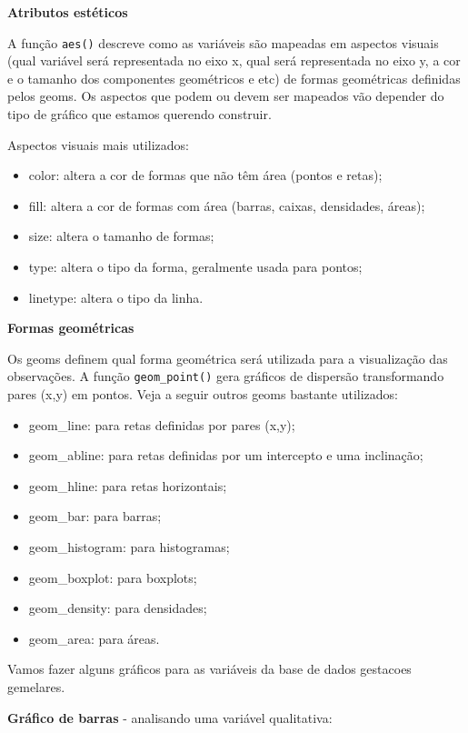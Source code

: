 \documentclass[
]{book}
\begin{document}
\textbf{Atributos estéticos}

A função \texttt{aes()} descreve como as variáveis são mapeadas em aspectos visuais (qual variável será representada no eixo x, qual será representada no eixo y, a cor e o tamanho dos componentes geométricos e etc) de formas geométricas definidas pelos geoms. Os aspectos que podem ou devem ser mapeados vão depender do tipo de gráfico que estamos querendo construir.

Aspectos visuais mais utilizados:

\begin{itemize}
\item
  color: altera a cor de formas que não têm área (pontos e retas);
\item
  fill: altera a cor de formas com área (barras, caixas, densidades, áreas);
\item
  size: altera o tamanho de formas;
\item
  type: altera o tipo da forma, geralmente usada para pontos;
\item
  linetype: altera o tipo da linha.
\end{itemize}

\textbf{Formas geométricas}

Os geoms definem qual forma geométrica será utilizada para a visualização das observações. A função \texttt{geom\_point()} gera gráficos de dispersão transformando pares (x,y) em pontos. Veja a seguir outros geoms bastante utilizados:

\begin{itemize}
\item
  geom\_line: para retas definidas por pares (x,y);
\item
  geom\_abline: para retas definidas por um intercepto e uma inclinação;
\item
  geom\_hline: para retas horizontais;
\item
  geom\_bar: para barras;
\item
  geom\_histogram: para histogramas;
\item
  geom\_boxplot: para boxplots;
\item
  geom\_density: para densidades;
\item
  geom\_area: para áreas.
\end{itemize}

Vamos fazer alguns gráficos para as variáveis da base de dados gestacoes gemelares.

\textbf{Gráfico de barras} - analisando uma variável qualitativa:
\end{document}
